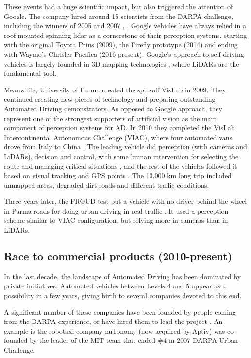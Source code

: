 These events had a huge scientific impact, but also triggered the attention of 
Google. The company hired around 15 scientists from the DARPA challenge, 
including the winners of 2005 and 2007 \cite{Montemerlo2008}, 
\cite{Levinson2011}. Google vehicles have always relied in a roof-mounted 
spinning lidar as a cornerstone of their perception systems, starting with the 
original Toyota Prius (2009), the Firefly prototype (2014) and ending with 
Waymo's Chrisler Pacifica (2016-present).
Google's approach to self-driving vehicles is largely founded in 3D mapping technologies \cite{Chapell2016}, where LiDARs are the fundamental tool.

Meanwhile, University of Parma created the spin-off VisLab in 2009. They 
continued creating new pieces of technology and preparing outstanding Automated 
Driving demonstrators. As opposed to Google approach, they represent one of the 
strongest supporters of artificial vision as the main component of perception 
systems for AD. In 2010 they completed the VisLab Intercontinental Autonomous 
Challenge (VIAC), where four automated vans drove from Italy to China 
\cite{Bertozzi2011}.
The leading vehicle did perception (with cameras and LiDARs), decision and 
control, with some human intervention for selecting the route and managing 
critical situations \cite{Broggi2012a}, and the rest of the vehicles followed 
it based on visual tracking and GPS points \cite{Broggi2012a}. The 13,000 km 
long trip included unmapped areas, degraded dirt roads and different traffic 
conditions. 

Three years later, the PROUD test put a vehicle with no driver behind the wheel in Parma roads for doing urban driving in real traffic \cite{Broggi2013}. It used a perception scheme similar to VIAC configuration, but relying more in cameras than in LiDARs.
 
\subsection{Race to commercial products (2010-present)}
 
In the last decade, the landscape of Automated Driving has been dominated by private initiatives. Automated vehicles between Levels 4 and 5 appear as a possibility in a few years, giving birth to several companies devoted to this end. 

A significant number of these companies have been founded by people coming from the DARPA experience, or have hired them to lead the project \cite{Chapell2016}. An example is the robotaxi company nuTonomy (now acquired by Aptiv) was co-founded by the leader of the MIT team that ended \#4 in 2007 DARPA Urban Challenge.

